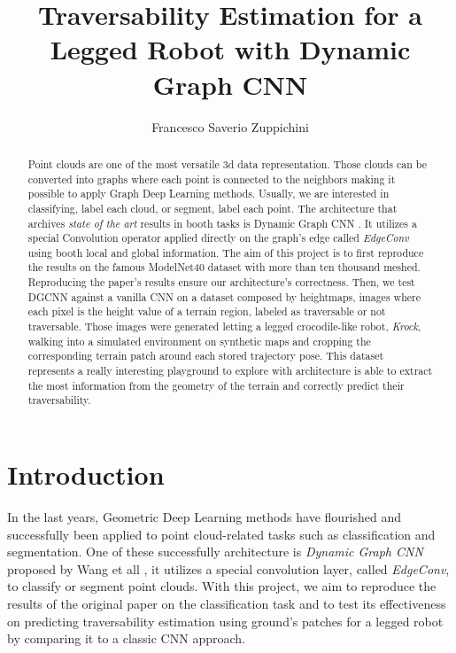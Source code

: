 \documentclass[twocolumn,showpacs,%
  nofootinbib,aps,superscriptaddress,%
  eqsecnum,prd,notitlepage,showkeys,10pt]{revtex4-1}
\begin{document}
\title{Traversability Estimation for a Legged Robot with Dynamic Graph CNN}
\author{Francesco Saverio Zuppichini}
\begin{abstract}
  Point clouds are one of the most versatile 3d data representation. Those clouds can be converted into graphs where each point is connected to the neighbors making it possible to
  apply Graph Deep Learning methods. Usually, we are interested in classifying, label each cloud, or segment, label each point. The architecture that archives \emph{state of the art} results in booth tasks is Dynamic Graph CNN \cite{dgcnn}. It utilizes a special Convolution operator applied directly on the graph's edge called \emph{EdgeConv} using booth local and global information. The aim of this project is to first reproduce the results on the famous ModelNet40 \cite{shapenet} dataset with more than ten thousand meshed. Reproducing the paper's results ensure our architecture's correctness.
  Then, we test DGCNN against a vanilla CNN on a dataset composed by heightmaps, images where each pixel is the height value of a terrain region, labeled as traversable or not traversable. Those images were generated letting a legged crocodile-like robot, \emph{Krock}, walking into a simulated environment on synthetic maps and cropping the corresponding terrain patch around each stored trajectory pose. This dataset represents a really interesting playground to explore with architecture is able to extract the most information from the geometry of the terrain and correctly predict their traversability. 
\end{abstract}
\maketitle
\section{Introduction}
In the last years, Geometric Deep Learning methods have flourished and successfully been applied to point cloud-related tasks such as classification and segmentation. One of these successfully architecture is \emph{Dynamic Graph CNN} proposed by Wang et all \cite{dgcnn}, it utilizes a special convolution layer, called \emph{EdgeConv}, to classify or segment point clouds. With this project, we aim to reproduce the results of the original paper on the classification task and to test its effectiveness on predicting traversability estimation using ground's patches for a legged robot by comparing it to a classic CNN approach.  
\end{document}
